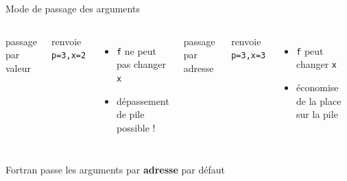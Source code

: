 \documentclass[11pt,mathserif]{beamer}
\newcommand{\scout}{\faAngellist}
\newcommand{\argi}{\faLightbulbO}
\newcommand{\kontuz}{\faExclamationTriangle}
\newcommand{\triste}{\faFrownO}
\newif\ifC
\newcommand{\mylang}{c}
\newcommand{\extlang}{c}
\newcommand{\mylang}{fortran}
\newcommand{\extlang}{f90}
\newcommand{\includeSrc}[1]{}
\begin{document}
\ifC
\begin{frame}{Interlude sur les Pointeurs}
  \lstset{basicstyle=\relsize{-1}\ttfamily}
\begin{itemize}[<+->]
  \item Un pointeur est une variable contenant l'adresse d'une autre
  \item déclaration : \lstinline! int * p; // p est pointeur sur des ints !
  \item allocation  : \lstinline! p = (int *) malloc(4*sizeof(int)); // alloue 4 entiers !
  \item désallocation : \lstinline! free(p); // libere la memoire !
  \item déréfencement : \lstinline! *p = 2 ;! ou \lstinline !p[0] = 2;!
  \item «adresse de» : \lstinline! int t[] = \{1,2,3\} ; p=\&t[0] ; (*p)++;!
  \item[\argi] \lstinline!*! $\circ$ \lstinline!\&! = $I_{valeurs}$ et \lstinline!\&! $\circ$ \lstinline!*! = $I_{adresses}$
  \item arithmétique : \lstinline! for(p=\&t[0]; p\!=\&t[0]+3;) (*(p++))++; !
  \item[\scout] notation : \lstinline! p[i] ! $\equiv$ \lstinline! *(i+p)! $\equiv$ \lstinline! i[p]!
  \item utilisation 
    \begin{itemize}
      \item passage par adresse des arguments de fonction
      \item gestion de mémoire
    \end{itemize}
\end{itemize}
  \lstset{basicstyle=\relsize{-3}\ttfamily}
\end{frame}
\fi
\begin{frame}{Mode de passage des arguments}
\begin{columns}[t]
\pause
\column{5cm}
 passage par valeur
  \includeSrc{code/valeur}
  renvoie \lstinline! p=3,x=2!
  \begin{itemize}
    \item[\triste] {\tt f} ne peut pas changer {\tt x}
    \item[\kontuz] dépassement de pile possible !
   \end{itemize} 
\pause
\column{5cm}
 passage par adresse
  \includeSrc{code/adresse}
  renvoie \lstinline! p=3,x=3!
  \begin{itemize}
    \item[\scout] {\tt f} peut changer {\tt x}
    \item[\argi] économise de la place sur la pile
   \end{itemize} 
\end{columns}
  \begin{center}
    \ifC le C passe les arguments par {\bf valeur } \else Fortran passe les arguments par {\bf adresse } \fi par défaut
  \end{center} 
\end{frame}
\end{document}
